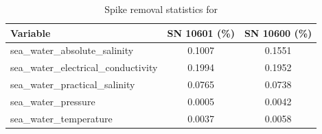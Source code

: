 \begin{table}[h]
\centering
\caption{Spike removal statistics for \projectname{} \casenumber{}}
\label{tab:spike_stats}
\begin{tabular}{|l|c|c|}
\hline
Variable & SN 10601 (\%) & SN 10600 (\%) \\
\hline
sea\_water\_absolute\_salinity & 0.1007 & 0.1551 \\
sea\_water\_electrical\_conductivity & 0.1994 & 0.1952 \\
sea\_water\_practical\_salinity & 0.0765 & 0.0738 \\
sea\_water\_pressure & 0.0005 & 0.0042 \\
sea\_water\_temperature & 0.0037 & 0.0058 \\
\hline
\end{tabular}
\end{table}
